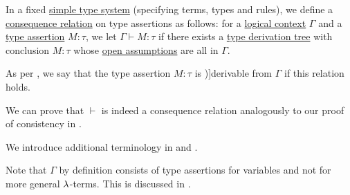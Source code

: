 \begin{definition}\label{def:simple_type_derivability}\mimprovised
  In a fixed \hyperref[def:simple_type_system]{simple type system} (specifying terms, types and rules), we define a \hyperref[def:consequence_relation]{consequence relation} on type assertions as follows: for a \hyperref[def:logical_context]{logical context} \( \Gamma \) and a \hyperref[def:type_assertion]{type assertion} \( M: \tau \), we let \( \Gamma \vdash M: \tau \) if there exists a \hyperref[def:type_derivation_tree]{type derivation tree} with conclusion \( M: \tau \) whose \hyperref[def:natural_deduction_proof_tree/context]{open assumptions} are all in \( \Gamma \).

  As per , we say that the type assertion \( M: \tau \) is \term[en=derivable (\cite[def. 3.1.4]{Barendregt1992LambdaCalculiWithTypes})]{derivable} from \( \Gamma \) if this relation holds.
\end{definition}
\begin{defproof}
  We can prove that \( {\vdash} \) is indeed a consequence relation analogously to our proof of consistency in .
\end{defproof}
\begin{comments}
  \item We introduce additional terminology in  and .

  \item Note that \( \Gamma \) by definition consists of type assertions for variables and not for more general \( \mathrm{\lambda} \)-terms. This is discussed in .
\end{comments}

